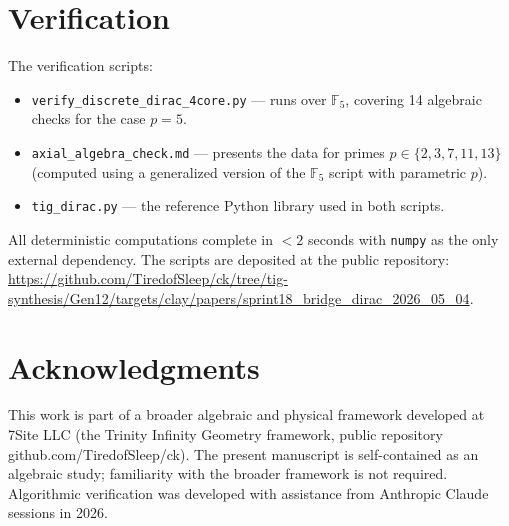 \documentclass[11pt,reqno]{amsart}
\theoremstyle{plain}
\theoremstyle{definition}
\theoremstyle{remark}
\newcommand{\F}{\mathbb{F}}
\begin{document}
\section{Verification}
\label{sec:verify}

The verification scripts:
\begin{itemize}
\item \texttt{verify\_discrete\_dirac\_4core.py} --- runs over $\F_5$,
covering 14 algebraic checks for the case $p=5$.
\item \texttt{axial\_algebra\_check.md} --- presents the data for primes
$p \in \{2, 3, 7, 11, 13\}$ (computed using a generalized version of
the $\F_5$ script with parametric $p$).
\item \texttt{tig\_dirac.py} --- the reference Python library used in
both scripts.
\end{itemize}

All deterministic computations complete in $<2$ seconds with
\texttt{numpy} as the only external dependency. The scripts are
deposited at the public repository:
\url{https://github.com/TiredofSleep/ck/tree/tig-synthesis/Gen12/targets/clay/papers/sprint18_bridge_dirac_2026_05_04}.

\section*{Acknowledgments}

This work is part of a broader algebraic and physical framework
developed at 7Site LLC (the Trinity Infinity Geometry framework, public
repository github.com/TiredofSleep/ck). The present manuscript is
self-contained as an algebraic study; familiarity with the broader
framework is not required. Algorithmic verification was developed with
assistance from Anthropic Claude sessions in 2026.
\end{document}
